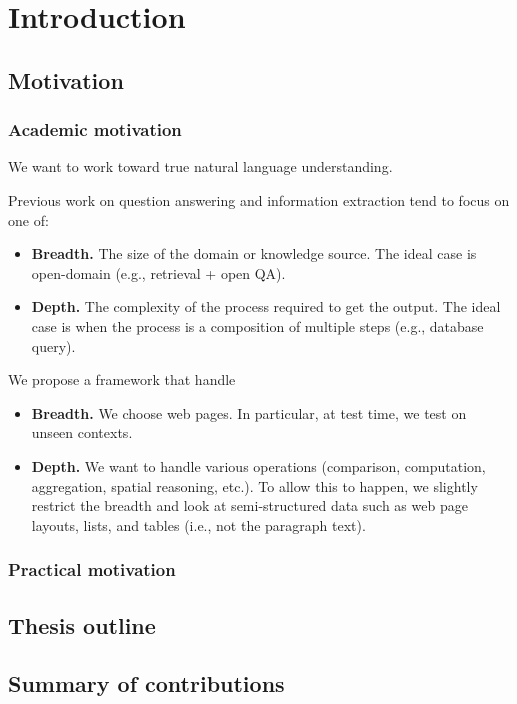\chapter{Introduction}\label{chp:intro}

\section{Motivation}

\subsection{Academic motivation}
We want to work toward true natural language understanding.

Previous work on question answering
and information extraction tend to focus on one of:

\begin{itemize}
\item \textbf{Breadth.}
The size of the domain or knowledge source.
The ideal case is open-domain (e.g., retrieval + open QA).
\item \textbf{Depth.}
The complexity of the process required to get the output.
The ideal case is when the process is a composition of
multiple steps (e.g., database query).
\end{itemize}

We propose a framework that handle 
\begin{itemize}
\item \textbf{Breadth.}
We choose web pages.
In particular, at test time, we test on unseen contexts.
\item \textbf{Depth.}
We want to handle various operations
(comparison, computation, aggregation, spatial reasoning, etc.).
To allow this to happen, we slightly restrict the breadth
and look at semi-structured data such as
web page layouts, lists, and tables
(i.e., not the paragraph text).
\end{itemize}

\subsection{Practical motivation}


\section{Thesis outline}

\section{Summary of contributions}